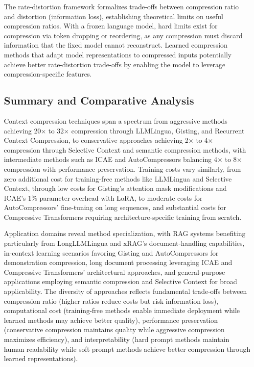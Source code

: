 The rate-distortion framework formalizes trade-offs between compression ratio and distortion (information loss), establishing theoretical limits on useful compression ratios. With a frozen language model, hard limits exist for compression via token dropping or reordering, as any compression must discard information that the fixed model cannot reconstruct. Learned compression methods that adapt model representations to compressed inputs potentially achieve better rate-distortion trade-offs by enabling the model to leverage compression-specific features.

\subsection{Summary and Comparative Analysis}

Context compression techniques span a spectrum from aggressive methods achieving 20$\times$ to 32$\times$ compression through LLMLingua, Gisting, and Recurrent Context Compression, to conservative approaches achieving 2$\times$ to 4$\times$ compression through Selective Context and semantic compression methods, with intermediate methods such as ICAE and AutoCompressors balancing 4$\times$ to 8$\times$ compression with performance preservation. Training costs vary similarly, from zero additional cost for training-free methods like LLMLingua and Selective Context, through low costs for Gisting's attention mask modifications and ICAE's 1\% parameter overhead with LoRA, to moderate costs for AutoCompressors' fine-tuning on long sequences, and substantial costs for Compressive Transformers requiring architecture-specific training from scratch.

Application domains reveal method specialization, with RAG systems benefiting particularly from LongLLMLingua and xRAG's document-handling capabilities, in-context learning scenarios favoring Gisting and AutoCompressors for demonstration compression, long document processing leveraging ICAE and Compressive Transformers' architectural approaches, and general-purpose applications employing semantic compression and Selective Context for broad applicability. The diversity of approaches reflects fundamental trade-offs between compression ratio (higher ratios reduce costs but risk information loss), computational cost (training-free methods enable immediate deployment while learned methods may achieve better quality), performance preservation (conservative compression maintains quality while aggressive compression maximizes efficiency), and interpretability (hard prompt methods maintain human readability while soft prompt methods achieve better compression through learned representations).

